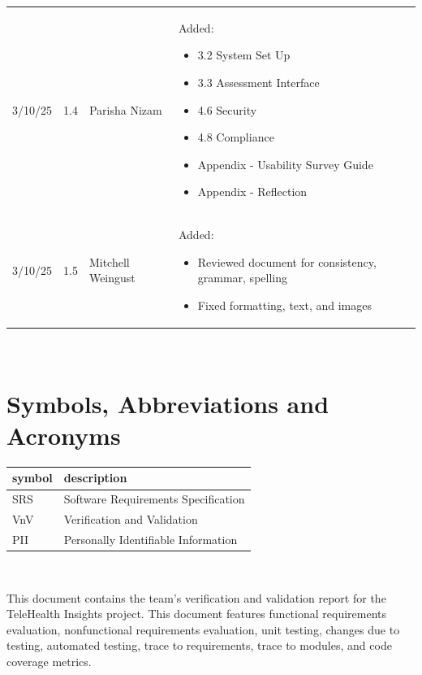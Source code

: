 \documentclass[12pt, titlepage]{article}
\begin{document}
\begin{table}[hp]
\begin{tabularx}{\textwidth}{p{1.5cm}p{1cm}p{3.5cm}X}
  3/10/25 & 1.4 & Parisha Nizam & Added:\begin{itemize}[leftmargin=*]
    \item 3.2 System Set Up
    \item 3.3 Assessment Interface
    \item 4.6 Security
    \item 4.8 Compliance 
    \item Appendix - Usability Survey Guide
    \item Appendix - Reflection
  \end{itemize}\\
  3/10/25 & 1.5 & Mitchell Weingust & Added:\begin{itemize}[leftmargin=*]
    \item Reviewed document for consistency, grammar, spelling
    \item Fixed formatting, text, and images
  \end{itemize}\\
  \bottomrule
  \end{tabularx}
  \end{table}

~\newpage

\section{Symbols, Abbreviations and Acronyms}

\renewcommand{\arraystretch}{1.2}
\begin{tabular}{l l} 
  \toprule		
  \textbf{symbol} & \textbf{description}\\
  \midrule 
  SRS & Software Requirements Specification\\
  VnV & Verification and Validation\\
  PII & Personally Identifiable Information\\
  \bottomrule
\end{tabular}\\

\newpage

\tableofcontents

\listoftables %

\listoffigures %

\newpage


\hspace{2em}This document contains the team's verification and validation report for the TeleHealth
Insights project. This document features functional requirements evaluation, nonfunctional requirements
evaluation, unit testing, changes due to testing, automated testing, trace to requirements, trace to modules,
and code coverage metrics.
\end{document}
